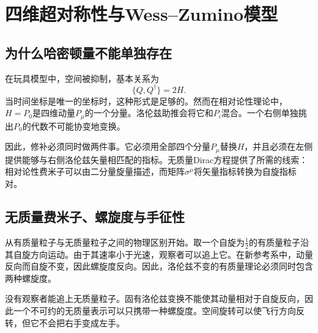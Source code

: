 \chapter{四维超对称性与Wess--Zumino模型}


\section{为什么哈密顿量不能单独存在}

在玩具模型中，空间被抑制，基本关系为
\begin{equation}
\{Q,Q^\dagger\}=2H.
\label{eq:l8-time-only-algebra}
\end{equation}
当时间坐标是唯一的坐标时，这种形式是足够的。然而在相对论性理论中，\(H=P_0\)是四维动量\(P_\mu\)的一个分量。洛伦兹助推会将它和\(P_i\)混合。一个右侧单独挑出\(P_0\)的代数不可能协变地变换。

因此，修补必须同时做两件事。它必须用全部四个分量\(P_\mu\)替换\(H\)，并且必须在左侧提供能够与右侧洛伦兹矢量相匹配的指标。无质量Dirac方程提供了所需的线索：相对论性费米子可以由二分量旋量描述，而矩阵\(\sigma^\mu\)将矢量指标转换为自旋指标对。

\section{无质量费米子、螺旋度与手征性}

从有质量粒子与无质量粒子之间的物理区别开始。取一个自旋为\(\tfrac12\)的有质量粒子沿其自旋方向运动。由于其速率小于光速，观察者可以追上它。在新参考系中，动量反向而自旋不变，因此螺旋度反向。因此，洛伦兹不变的有质量理论必须同时包含两种螺旋度。

没有观察者能追上无质量粒子。固有洛伦兹变换不能使其动量相对于自旋反向，因此一个不可约的无质量表示可以只携带一种螺旋度。空间旋转可以使飞行方向反转，但它不会把右手变成左手。

\begin{classroomqa}
\end{classroomqa}

